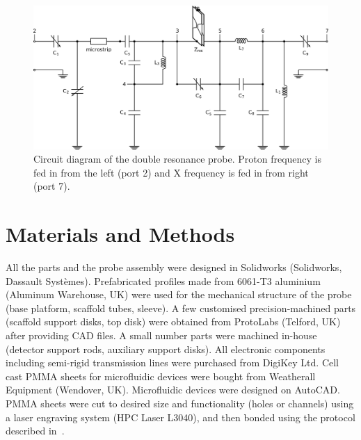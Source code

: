 \documentclass[preprint,5p]{elsarticle}
\begin{document}
\begin{figure}
\centering
\includegraphics[width=.8\linewidth,keepaspectratio=true]{./figures/ms5n17-tlp-im-180110-circuit-diagram.png}
\caption{Circuit diagram of the double resonance probe.
Proton frequency is fed in from the left (port 2) and X frequency is fed in from right (port 7).
}
\label{fig:circuit}
\end{figure}
\section{Materials and Methods}
All the parts and the probe assembly were designed in Solidworks (Solidworks,
Dassault Syst\`{e}mes). Prefabricated profiles made from 6061-T3 aluminium
(Aluminum Warehouse, UK) were used for the mechanical structure of the probe
(base platform, scaffold tubes, sleeve). A few customised precision-machined
parts (scaffold support disks, top disk) were obtained from ProtoLabs (Telford,
UK) after providing CAD files. A small number parts were machined in-house
(detector support rods, auxiliary support disks). All  electronic components
including semi-rigid transmission lines were purchased from DigiKey Ltd. Cell
cast PMMA sheets for microfluidic devices were bought from Weatherall Equipment
(Wendover, UK). Microfluidic devices were designed on AutoCAD. PMMA sheets were
cut to desired size and functionality (holes or channels) using a laser
engraving system  (HPC Laser L3040), and then bonded using the protocol
described in~\cite{yilmaz_bonding}.
\end{document}
